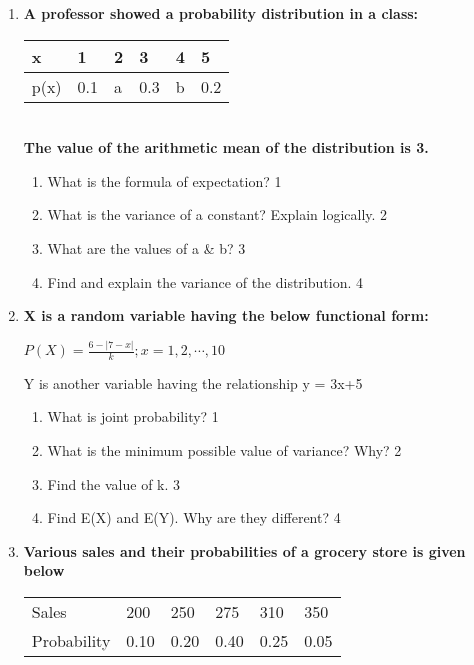 \documentclass[a4paper,oneside, margin=1.4in]{book}
\begin{document}
\begin{enumerate}
   \item
	  \textbf{A professor showed a probability distribution in a class:}
	  
	  \begin{table}[h]
	  \begin{center}
\begin{tabular}{llllll}
x    & 1   & 2 & 3   & 4 & 5   \\ \hline
p(x) & 0.1 & a & 0.3 & b & 0.2 
\end{tabular} \\
\textbf{The value of the arithmetic mean of the distribution is 3.}
\end{center}	
\end{table}
    
  \begin{enumerate}
    \item
	What is the formula of expectation? \hfill 1
    \item
	What is the variance of a constant? Explain logically. \hfill 2
    \item  
	What are the values of a \& b? \hfill 3
    \item
	Find and explain the variance of the distribution. \hfill 4
  \end{enumerate}
  
       \item
	  \textbf{X is a random variable having the below functional form:} 
  
  \begin{center}
  $P(X) = \frac{6-|7-x|}{k}; x = 1, 2, \cdots,10$ \\
  \end{center}  
  
  Y is another variable having the relationship y = 3x+5
  
  \begin{enumerate}
    \item
	What is joint probability? \hfill 1
    \item
	What is the minimum possible value of variance? Why? \hfill 2
    \item  
	Find the value of k. \hfill 3
    \item
	Find E(X) and E(Y). Why are they different? \hfill 4
  \end{enumerate}
  
       \item
  \textbf{Various sales and their probabilities of a grocery store is given below}
  
  \begin{table}[h]
  \centering
\begin{tabular}{llllll}
Sales & 200 & 250 & 275 & 310 & 350 \\
Probability & 0.10 & 0.20 & 0.40 & 0.25 & 0.05
\end{tabular}
\end{table}


\end{enumerate}
\end{document}
